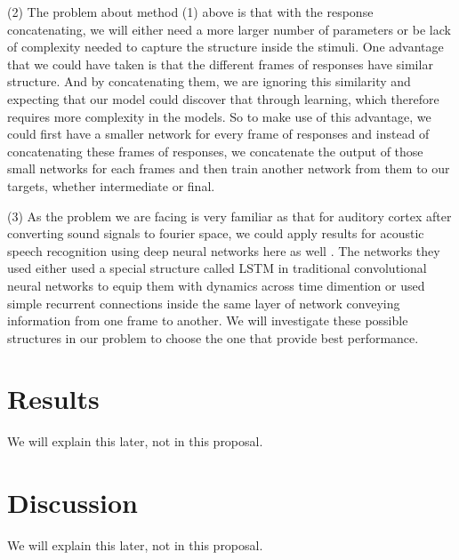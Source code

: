 \documentclass[12pt]{article}
\begin{document}
(2) The problem about method (1) above is that with the response concatenating, we will either need a more larger number of parameters or be lack of complexity needed to capture the structure inside the stimuli. One advantage that we could have taken is that the different frames of responses have similar structure. And by concatenating them, we are ignoring this similarity and expecting that our model could discover that through learning, which therefore requires more complexity in the models. So to make use of this advantage, we could first have a smaller network for every frame of responses and instead of concatenating these frames of responses, we concatenate the output of those small networks for each frames and then train another network from them to our targets, whether intermediate or final.

(3) As the problem we are facing is very familiar as that for auditory cortex after converting sound signals to fourier space, we could apply results for acoustic speech recognition using deep neural networks here as well \cite{Graves2013, Sak2014, Weng2014}. The networks they used either used a special structure called LSTM \cite{Hochreiter1997} in traditional convolutional neural networks to equip them with dynamics across time dimention or used simple recurrent connections inside the same layer of network conveying information from one frame to another. We will investigate these possible structures in our problem to choose the one that provide best performance.

\section*{Results}

We will explain this later, not in this proposal.

\section*{Discussion}

We will explain this later, not in this proposal.



%
%

\end{document}
